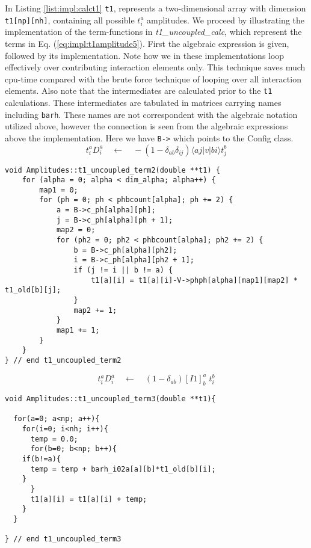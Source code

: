 In Listing \ref{list:impl:calct1} \texttt{t1}, represents a two-dimensional array with dimension \texttt{t1[np][nh]}, containing all possible $t_i^a$ amplitudes. We proceed by illustrating the implementation of the term-functions in \emph{t1\_uncoupled\_calc}, which represent the terms in Eq. (\ref{eq:impl:t1amplitude5}). First the algebraic expression is given, followed by its implementation. Note how we in these implementations loop effectively over contributing interaction elements only. This technique saves much cpu-time compared with the brute force technique of looping over all interaction elements. Also note that the intermediates are calculated prior to the \texttt{t1} calculations. These intermediates are tabulated in matrices carrying names including \texttt{barh}. These names are not correspondent with the algebraic notation utilized above, however the connection is seen from the algebraic expressions above the implementation. Here we have \texttt{B->} which points to the Config class.
%
\begin{equation*}
t_i^aD_i^a\quad \leftarrow \quad-(1-\delta_{ab}\delta_{ij})\langle aj|v|bi \rangle t_{j}^{b}
\end{equation*}
%
\begin{lstlisting}[label={list:impl:t1term2},caption={implementation of the amp1 class function t1\_uncoupled\_term2()}]
void Amplitudes::t1_uncoupled_term2(double **t1) {
    for (alpha = 0; alpha < dim_alpha; alpha++) {
        map1 = 0;
        for (ph = 0; ph < phbcount[alpha]; ph += 2) {
            a = B->c_ph[alpha][ph];
            j = B->c_ph[alpha][ph + 1];
            map2 = 0;
            for (ph2 = 0; ph2 < phbcount[alpha]; ph2 += 2) {
                b = B->c_ph[alpha][ph2];
                i = B->c_ph[alpha][ph2 + 1];
                if (j != i || b != a) {
                    t1[a][i] = t1[a][i]-V->phph[alpha][map1][map2] * t1_old[b][j];
                }
                map2 += 1;
            }
            map1 += 1;
        }
    }
} // end t1_uncoupled_term2
\end{lstlisting}
%
\begin{equation*}
t_i^aD_i^a\quad \leftarrow \quad(1-\delta_{ab})[I1]_b^a\phantom{.}t_i^b
\end{equation*}
%
\begin{lstlisting}[label={list:impl:t1term3},caption={implementation of the amp1 class function t1\_uncoupled\_term3()}]
void Amplitudes::t1_uncoupled_term3(double **t1){
  
  for(a=0; a<np; a++){
    for(i=0; i<nh; i++){ 
      temp = 0.0;
      for(b=0; b<np; b++){
	if(b!=a){
	  temp = temp + barh_i02a[a][b]*t1_old[b][i];
	}
      }
      t1[a][i] = t1[a][i] + temp;
    }
  }

} // end t1_uncoupled_term3
\end{lstlisting}
